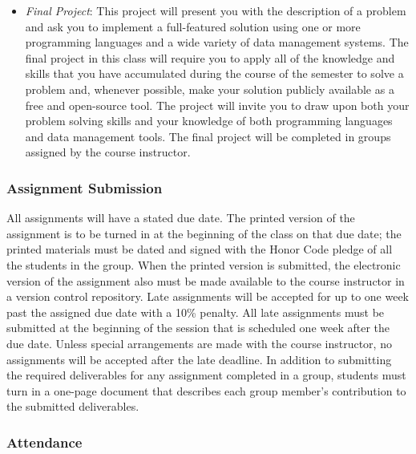 \begin{itemize}

    \item {\em Final Project}: This project will present you with the description of a problem and ask you to implement
      a full-featured solution using one or more programming languages and a wide variety of data management systems.
      The final project in this class will require you to apply all of the knowledge and skills that you have
      accumulated during the course of the semester to solve a problem and, whenever possible, make your solution
      publicly available as a free and open-source tool.  The project will invite you to draw upon both your problem
      solving skills and your knowledge of both programming languages and data management tools. The final project will
      be completed in groups assigned by the course instructor.

  \end{itemize}

  \subsubsection*{Assignment Submission}

  All assignments will have a stated due date. The printed version of the assignment is to be turned in at the beginning
  of the class on that due date; the printed materials must be dated and signed with the Honor Code pledge of all the
  students in the group.  When the printed version is submitted, the electronic version of the assignment also must be
  made available to the course instructor in a version control repository. Late assignments will be accepted for up to one
  week past the assigned due date with a 10\% penalty. All late assignments must be submitted at the beginning of the
  session that is scheduled one week after the due date. Unless special arrangements are made with the course instructor,
  no assignments will be accepted after the late deadline. In addition to submitting the required deliverables for any
  assignment completed in a group, students must turn in a one-page document that describes each group member's
  contribution to the submitted deliverables.  

  \subsubsection*{Attendance}

